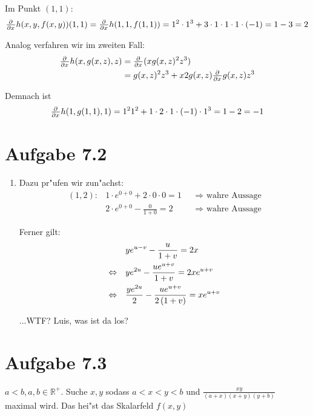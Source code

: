 \documentclass[a4paper,german,12pt,smallheadings]{scrartcl}
\begin{document}
\begin{enumerate}[(1)]
    Im Punkt $(1,1)$:
    \begin{align*}
      \pd{}{x} h(x,y,f(x,y))(1,1) = \pd{}{x} h(1,1,f(1,1)) = 1^2\cdot 1^3 + 3 \cdot 1 \cdot 1 \cdot 1 \cdot (-1) = 1-3 = 2
    \end{align*}

    Analog verfahren wir im zweiten Fall:
    \begin{align*}
      \pd{}{x}h(x,g(x,z),z) &= \pd{}{x}(xg(x,z)^2z^3) \\
                            &= g(x,z)^2z^3 + x2g(x,z) \pd{}{x} g(x,z) z^3
    \end{align*}

    Demnach ist
    \begin{align*}
      \pd{}{x} h(1,g(1,1),1) = 1^21^2 + 1 \cdot 2 \cdot 1 \cdot (-1) \cdot 1^3 = 1-2 = -1
    \end{align*}
\end{enumerate}

\section*{Aufgabe 7.2}
\begin{enumerate}[(1)]
  \item Dazu pr"ufen wir zun"achst:
    \begin{align*}
      (1,2): &1\cdot e^{0+0} + 2 \cdot 0 \cdot 0 = 1 &&\Rightarrow \text{ wahre Aussage} \\
             &2\cdot e^{0+0} - \frac{0}{1+0} = 2     &&\Rightarrow \text{ wahre Aussage}
    \end{align*}

    Ferner gilt:
    \begin{align*}
                           &ye^{u-v} - \frac{u}{1+v} = 2x \\
      \Leftrightarrow\quad &ye^{2u} - \frac{ue^{u+v}}{1+v} = 2xe^{u+v} \\
      \Leftrightarrow\quad &\frac{ye^{2u}}{2} - \frac{ue^{u+v}}{2\del{1+v}} = xe^{u+v} \\
    \end{align*}

    ...WTF? Luis, was ist da los?
\end{enumerate}


\section*{Aufgabe 7.3}
  $a<b, a,b \in \mathbb{R}^+$. Suche $x,y$ sodass $a < x < y < b$ und
  $\frac{xy}{(a+x)(x+y)(y+b)}$ maximal wird. Das hei"st das Skalarfeld $f(x,y)$
\end{document}
